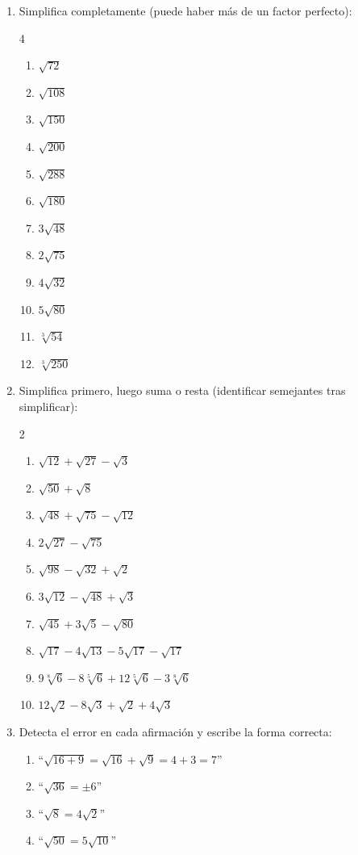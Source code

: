 \documentclass[11pt, letterpaper]{article}
\begin{document}
\begin{enumerate}[label=\textbf{\arabic*.}, leftmargin=*, resume]
  \item Simplifica completamente (puede haber más de un factor perfecto):
  \begin{multicols}{4}
  \begin{enumerate}[label=\alph*)]
    \item $\sqrt{72}$
    \item $\sqrt{108}$
    \item $\sqrt{150}$
    \item $\sqrt{200}$
    \item $\sqrt{288}$
    \item $\sqrt{180}$
    \item $3\sqrt{48}$
    \item $2\sqrt{75}$
    \item $4\sqrt{32}$
    \item $5\sqrt{80}$
    \item $\sqrt[3]{54}$
    \item $\sqrt[3]{250}$
  \end{enumerate}
  \end{multicols}

  \item Simplifica primero, luego suma o resta (identificar semejantes tras simplificar):
  \begin{multicols}{2}
  \begin{enumerate}[label=\alph*)]
    \item $\sqrt{12}+\sqrt{27}-\sqrt{3}$
    \item $\sqrt{50}+\sqrt{8}$
    \item $\sqrt{48}+\sqrt{75}-\sqrt{12}$
    \item $2\sqrt{27}-\sqrt{75}$
    \item $\sqrt{98}-\sqrt{32}+\sqrt{2}$
    \item $3\sqrt{12}-\sqrt{48}+\sqrt{3}$
    \item $\sqrt{45}+3\sqrt{5}-\sqrt{80}$
    \item $\sqrt{17}-4\sqrt{13}-5\sqrt{17}-\sqrt{17}$
    \item $9\sqrt[8]{6}-8\sqrt[5]{6}+12\sqrt[5]{6}-3\sqrt[8]{6}$
    \item $12\sqrt{2}-8\sqrt{3}+\sqrt{2}+4\sqrt{3}$
  \end{enumerate}
  \end{multicols}

  \item Detecta el error en cada afirmación y escribe la forma correcta:
  \begin{enumerate}[label=\alph*)]
    \item ``$\sqrt{16+9}=\sqrt{16}+\sqrt{9}=4+3=7$''
    \item ``$\sqrt{36}=\pm 6$''
    \item ``$\sqrt{8}=4\sqrt{2}$''
    \item ``$\sqrt{50}=5\sqrt{10}$''
  \end{enumerate}
\end{enumerate}
\end{document}
